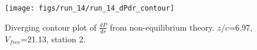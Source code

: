 \begin{figure}[H]
\centering
\texttt{[image: figs/run\_14/run\_14\_dPdr\_contour]}
\caption{Diverging contour plot of $\frac{d\bar{P}}{dr}$ from non-equilibrium theory. $z/c$=6.97, $V_{free}$=21.13, station 2.}
\label{fig:run_14_dPdr_contour}
\end{figure}


